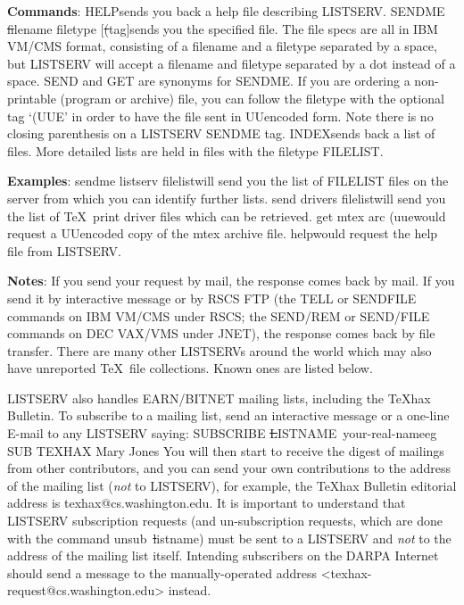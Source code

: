 {\bf Commands}:\nl
{\tx HELP}\quad sends you back a help file describing LISTSERV.\nl
{\tx SENDME} {\st filename filetype} $[${\st (tag\/}$]$\quad sends you
     the specified file. The file specs are all in IBM VM/CMS format,
     consisting of a filename and a filetype separated by a space, but
     LISTSERV will accept a filename and filetype separated by a dot
     instead of a space. {\tx SEND} and {\tx GET} are synonyms for
     {\tx SENDME}. If you are ordering a non-printable (program or
     archive) file, you can follow the filetype with the optional tag
     `{\tx (UUE}' in order to have the file sent in UUencoded form. Note
     there is no closing parenthesis on a LISTSERV {\tx SENDME} tag.\nl
{\tx INDEX}\quad sends back a list of files. More detailed lists are
     held in files with the filetype {\tx FILELIST}.

{\bf Examples}:\nl
{\tx sendme listserv filelist}\quad will send you the list of
     {\tx FILELIST} files on the server from which you can identify
     further lists.\nl
{\tx send drivers filelist}\quad will send you the list of \TeX\ print
     driver files which can be retrieved.\nl
{\tx get mtex arc (uue}\quad would request a UUencoded copy of the
     {\tx mtex} archive file.\nl
{\tx help}\quad would request the help file from LISTSERV.

{\bf Notes}: If you send your request by mail, the response comes back
     by mail. If you send it by interactive message or by RSCS FTP (the
     {\tx TELL} or {\tx SENDFILE} commands on IBM VM/CMS under RSCS; the
     {\tx SEND/REM} or {\tx SEND/FILE} commands on DEC VAX/VMS under
     JNET), the response comes back by file transfer. There are many
     other {\tx LISTSERV}s around the world which may also have
     unreported \TeX\ file collections. Known ones are listed below.

{\tx LISTSERV} also handles EARN/BITNET mailing lists, including the
     \TeX hax Bulletin. To subscribe to a mailing list, send an
     interactive message or a one-line E-mail to any {\tx LISTSERV}
     saying:\nl
{\tx SUBSCRIBE} {\st LISTNAME~your-real-name}\quad eg\nl
{\tx SUB TEXHAX Mary Jones}\nl
     You will then start to receive the digest of mailings from other
     contributors, and you can send your own contributions to the
     address of the mailing list ({\it not\/} to {\tx LISTSERV}),
     for example, the \TeX hax Bulletin editorial address is
     {\tx texhax@cs.washington.edu}.\nl
     It is important to understand that LISTSERV subscription requests
     (and un-subscription requests, which are done with the command {\tx
     unsub}~{\st listname}) must be sent to a {\tx LISTSERV} and {\it
     not\/} to the address of the mailing list itself. \nl
     Intending subscribers on the DARPA Internet should send a message
     to the manually-operated address
     <{\tx texhax-request@cs.washington.edu}> instead.

